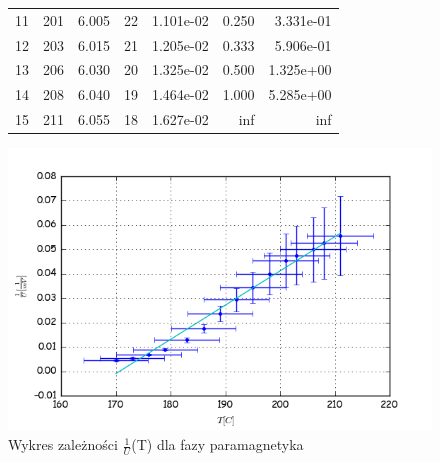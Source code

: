 \documentclass[a4paper,10pt]{article}
\begin{document}
\begin{figure}
\begin{tabular}{lrrrrrr}
11 &            201 &                  6.005 &                           22 &                           1.101e-02 &                                0.250 &                                   3.331e-01 \\
12 &            203 &                  6.015 &                           21 &                           1.205e-02 &                                0.333 &                                   5.906e-01 \\
13 &            206 &                  6.030 &                           20 &                           1.325e-02 &                                0.500 &                                   1.325e+00 \\
14 &            208 &                  6.040 &                           19 &                           1.464e-02 &                                1.000 &                                   5.285e+00 \\
15 &            211 &                  6.055 &                           18 &                           1.627e-02 &                                  inf &                                         inf \\
\bottomrule
\end{tabular}
\end{figure}
\begin{figure}[H]
  \includegraphics{./Curie_odwrotnosc.png}
  \caption{Wykres zależności $\frac{1}{U}$(T) dla fazy paramagnetyka}
\end{figure}
\end{document}
